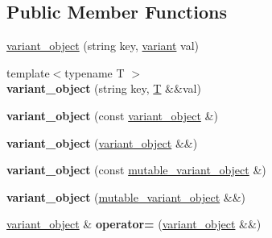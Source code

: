 \subsection*{Public Member Functions}
\begin{DoxyCompactItemize}
\item 
\mbox{\hyperlink{classfc_1_1variant__object_adf9035916f5395ac5858746b83ce6032}{variant\+\_\+object}} (string key, \mbox{\hyperlink{classfc_1_1variant}{variant}} val)
\item 
\mbox{\label{classfc_1_1variant__object_a504a177eb5c5f1ce4e78852205f0438a}} 
{\footnotesize template$<$typename T $>$ }\\{\bfseries variant\+\_\+object} (string key, \mbox{\hyperlink{struct_t}{T}} \&\&val)
\item 
\mbox{\label{classfc_1_1variant__object_a3907c53c2ad996060f7fe537e4ec3cf5}} 
{\bfseries variant\+\_\+object} (const \mbox{\hyperlink{classfc_1_1variant__object}{variant\+\_\+object}} \&)
\item 
\mbox{\label{classfc_1_1variant__object_ad5d30ab5e0dcc6f681055d4448091eef}} 
{\bfseries variant\+\_\+object} (\mbox{\hyperlink{classfc_1_1variant__object}{variant\+\_\+object}} \&\&)
\item 
\mbox{\label{classfc_1_1variant__object_ace7473ca89fd326892850e1a6e6d8eb6}} 
{\bfseries variant\+\_\+object} (const \mbox{\hyperlink{classfc_1_1mutable__variant__object}{mutable\+\_\+variant\+\_\+object}} \&)
\item 
\mbox{\label{classfc_1_1variant__object_adacb3e19bc46992cda48ef007316adf4}} 
{\bfseries variant\+\_\+object} (\mbox{\hyperlink{classfc_1_1mutable__variant__object}{mutable\+\_\+variant\+\_\+object}} \&\&)
\item 
\mbox{\label{classfc_1_1variant__object_a9b220de00d57176dc5b33022288b6a19}} 
\mbox{\hyperlink{classfc_1_1variant__object}{variant\+\_\+object}} \& {\bfseries operator=} (\mbox{\hyperlink{classfc_1_1variant__object}{variant\+\_\+object}} \&\&)
\item 
\mbox{\label{classfc_1_1variant__object_ab034399ddd26cdad32186284c9a0b959}} 

\end{DoxyCompactItemize}
